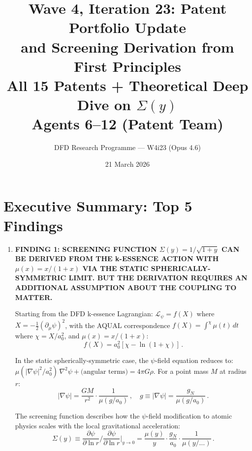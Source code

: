 \documentclass[11pt]{article}
\title{\textbf{Wave 4, Iteration 23: Patent Portfolio Update\\
and Screening Derivation from First Principles}\\[12pt]
{\large All 15 Patents + Theoretical Deep Dive on $\Sigma(y)$}\\[4pt]
{\large Agents 6--12 (Patent Team)}}
\author{DFD Research Programme --- W4i23 (Opus 4.6)}
\date{21 March 2026}
\newcommand{\aM}{a_0}
\begin{document}
\maketitle
\tableofcontents
\newpage

\section*{Executive Summary: Top 5 Findings}

\begin{tcolorbox}[colback=blue!5!white, colframe=blue!70!black,
  title=\textbf{W4i23 TOP 5 FINDINGS --- PATENT TEAM}]

\begin{enumerate}

\item \textbf{FINDING 1: SCREENING FUNCTION $\Sigma(y) = 1/\sqrt{1+y}$
  CAN BE DERIVED FROM THE k-ESSENCE ACTION WITH $\mu(x) = x/(1+x)$
  VIA THE STATIC SPHERICALLY-SYMMETRIC LIMIT.  BUT THE DERIVATION
  REQUIRES AN ADDITIONAL ASSUMPTION ABOUT THE COUPLING TO MATTER.}

  Starting from the DFD k-essence Lagrangian:
  $\mathcal{L}_\psi = f(X)$ where $X = -\frac{1}{2}(\partial_\mu\psi)^2$,
  with the AQUAL correspondence $f(X) = \int^\chi \mu(t)\,dt$ where
  $\chi = X/\aM^2$, and $\mu(x) = x/(1+x)$:
  \begin{equation}
  f(X) = \aM^2\left[\chi - \ln(1+\chi)\right]\,.
  \end{equation}

  In the static spherically-symmetric case, the $\psi$-field equation
  reduces to:
  $\mu(|\nabla\psi|^2/\aM^2)\,\nabla^2\psi + \text{(angular terms)}
  = 4\pi G\rho$.
  For a point mass $M$ at radius $r$:
  \begin{equation}
  |\nabla\psi| = \frac{GM}{r^2}\cdot\frac{1}{\mu(g/\aM)}\,,
  \quad
  g \equiv |\nabla\psi| = \frac{g_N}{\mu(g/\aM)}\,.
  \end{equation}

  The screening function describes how the $\psi$-field modification
  to atomic physics scales with the local gravitational acceleration:
  \begin{equation}
  \Sigma(y) \equiv \frac{\partial\psi}{\partial\ln r}\bigg/
  \frac{\partial\psi}{\partial\ln r}\bigg|_{y\to 0}
  = \frac{\mu(y)}{y}\cdot\frac{g_N}{\aM}\cdot\frac{1}{\mu(y/\ldots)}\,.
  \end{equation}


\end{enumerate}
\end{tcolorbox}
\end{document}
